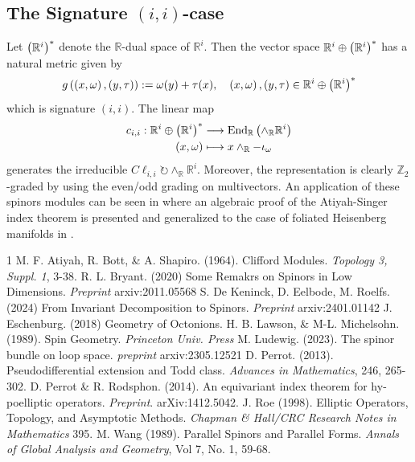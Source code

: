 \documentclass[openany, 11pt]{article}
\theoremstyle{definition}
\theoremstyle{remark}
\def\lp{\ensuremath{\left(}}
\def\rp{\ensuremath{\right)}}
\def\bR{\ensuremath{\mathbb{R}}}
\def\bZ{\ensuremath{\mathbb{Z}}}
\def\End{\ensuremath{\textnormal{End}}}
\begin{document}
\subsection{The Signature $(i,i)$-case}
Let $\lp\bR^i\rp^*$ denote the $\bR$-dual space of $\bR^i$. Then the vector space $\bR^i\oplus\lp\bR^i\rp^*$ has a natural metric given by
\[
    g\lp \lp x,\omega\rp,\lp y,\tau\rp\rp:=\omega(y)+\tau(x),\quad \lp x,\omega\rp,\lp y,\tau\rp\in\bR^i\oplus\lp\bR^i\rp^*
\]
which is signature $(i,i)$. The linear map
\begin{align*}
    c_{i,i}:\bR^i\oplus\lp\bR^i\rp^*&\longrightarrow\End_{\bR}\lp\wedge_{\bR}\bR^i\rp\\
    \lp x,\omega\rp&\longmapsto x\wedge_{\bR}-\iota_{\omega}
\end{align*}
generates the irreducible $C\ell_{i,i}\circlearrowright\wedge_{\bR}\bR^i$. Moreover, the representation is clearly $\bZ_2$-graded by using the even/odd grading on multivectors. An application of these spinors modules can be seen in \cite{Per} where an algebraic proof of the Atiyah-Singer index theorem is presented and generalized to the case of foliated Heisenberg manifolds in \cite{PR}.



\begin{thebibliography}{1}
 M. F. Atiyah, R. Bott, \& A. Shapiro. (1964). Clifford Modules. \emph{Topology 3, Suppl. 1}, 3-38.
 R. L. Bryant. (2020) Some Remakrs on Spinors in Low Dimensions. \emph{Preprint} arxiv:2011.05568
 S. De Keninck, D. Eelbode, M. Roelfs. (2024) From Invariant Decomposition to Spinors. \emph{Preprint} arxiv:2401.01142
 J. Eschenburg. (2018) Geometry of Octonions.
 H. B. Lawson, \& M-L. Michelsohn. (1989). Spin Geometry. \emph{Princeton Univ. Press}
 M. Ludewig. (2023). The spinor bundle on loop space. \emph{preprint} arxiv:2305.12521
 D. Perrot. (2013). Pseudodifferential extension and Todd class. \emph{Advances in Mathematics}, 246, 265-302.
 D. Perrot \& R. Rodsphon. (2014). An equivariant index theorem for hy- poelliptic operators. \emph{Preprint}. arXiv:1412.5042.
 J. Roe (1998). Elliptic Operators, Topology, and Asymptotic Methods. \emph{Chapman \& Hall/CRC Research Notes in Mathematics} 395.
 M. Wang (1989). Parallel Spinors and Parallel Forms. \emph{Annals of Global Analysis and Geometry}, Vol 7, No. 1, 59-68.


\end{thebibliography}
\end{document}
